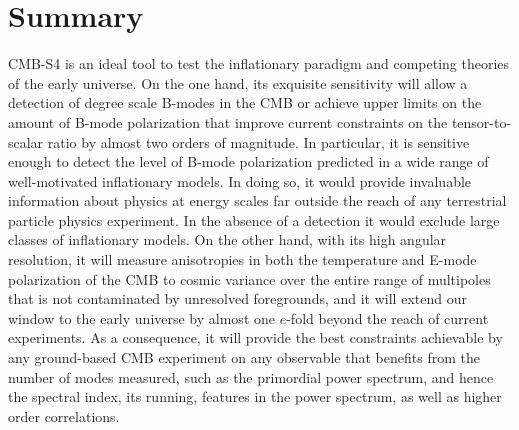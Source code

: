 
\section{Summary}
CMB-S4 is an ideal tool to test the inflationary paradigm and competing theories of the early universe. On the one hand, its exquisite sensitivity will allow a detection of degree scale B-modes in the CMB or achieve upper limits on the amount of B-mode polarization that improve current constraints on the tensor-to-scalar ratio by almost two orders of magnitude. In particular, it is sensitive enough to detect the level of B-mode polarization predicted in a wide range of well-motivated inflationary models. In doing so, it would provide invaluable information about physics at energy scales far outside the reach of any terrestrial particle physics experiment. In the absence of a detection it would exclude large classes of inflationary models. On the other hand, with its high angular resolution, it will measure anisotropies in both the temperature and E-mode polarization of the CMB to cosmic variance over the entire range of multipoles that is not contaminated by unresolved foregrounds, and it will extend our window to the early universe by almost one $e$-fold beyond the reach of current experiments. As a consequence, it will provide the best constraints achievable by any ground-based CMB experiment on any observable that benefits from the number of modes measured, such as the primordial power spectrum, and hence the spectral index, its running, features in the power spectrum, as well as higher order correlations.


 
